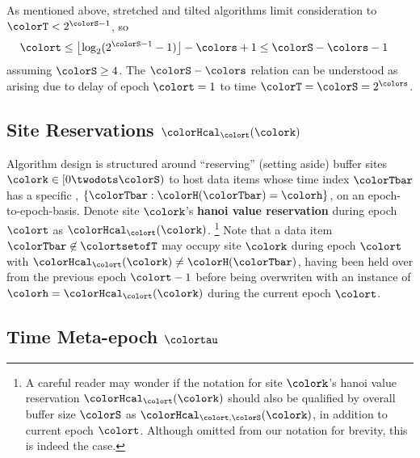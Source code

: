 As mentioned above, stretched and tilted algorithms limit consideration to $\colorT < 2^{\colorS - 1}$, so
\begin{align*}
\colort &\leq \left\lfloor\log_2(2^{\colorS - 1} - 1)\right\rfloor - \colors + 1
\leq \colorS - \colors - 1
\end{align*}
assuming $\colorS \geq 4$.
The $\colorS - \colors$ relation can be understood as arising due to delay of epoch $\colort=1$ to time $\colorT = \colorS = 2^{\colors}$.

\subsection{Site Reservations $\colorHcal_{\colort}(\colork)$}
\label{sec:notation-reservation}

Algorithm design is structured around ``reserving'' (setting aside) buffer sites $\colork \in [0 \twodots \colorS)$ to host data items whose time index $\colorTbar$ has a specific \hv{}, $\{\colorTbar : \colorH(\colorTbar) = \colorh \}$, on an epoch-to-epoch-basis.
Denote site $\colork$'s \textbf{hanoi value reservation} during epoch $\colort$ as $\colorHcal_{\colort}(\colork)$.%
\footnote{
A careful reader may wonder if the notation for site $\colork$'s hanoi value reservation $\colorHcal_{\colort}(\colork)$ should also be qualified by overall buffer size $\colorS$ as $\colorHcal_{\colort,\colorS}(\colork)$, in addition to current epoch $\colort$.
Although omitted from our notation for brevity, this is indeed the case.
}
Note that a data item $\colorTbar \not\in \colortsetofT$ may occupy site $\colork$ during epoch $\colort$ with $\colorHcal_{\colort}(\colork) \neq \colorH(\colorTbar)$, having been held over from the previous epoch $\colort - 1$ before being overwriten with an instance of \hv{} $\colorh = \colorHcal_{\colort}(\colork)$ during the current epoch $\colort$.

\subsection{Time Meta-epoch $\colortau$}
\label{sec:notation-metaepoch}

